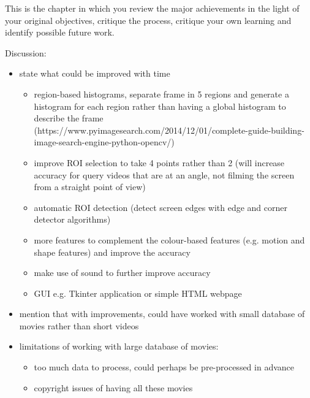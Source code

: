 This is the chapter in which you review the major achievements in the
light of your original objectives, critique the process, critique your
own learning and identify possible future work.

Discussion:
\begin{itemize}
    \item state what could be improved with time
    \begin{itemize}
        \item region-based histograms, separate frame in 5 regions and generate a histogram for each region rather than having a global histogram to describe the frame (https://www.pyimagesearch.com/2014/12/01/complete-guide-building-image-search-engine-python-opencv/)
        \item improve ROI selection to take 4 points rather than 2 (will increase accuracy for query videos that are at an angle, not filming the screen from a straight point of view)
        \item automatic ROI detection (detect screen edges with edge and corner detector algorithms)
        \item more features to complement the colour-based features (e.g. motion and shape features) and improve the accuracy
        \item make use of sound to further improve accuracy
        \item GUI e.g. Tkinter application or simple HTML webpage
    \end{itemize} 
    \item mention that with improvements, could have worked with small database of movies rather than short videos
    \item limitations of working with large database of movies: 
    \begin{itemize}
        \item too much data to process, could perhaps be pre-processed in advance
        \item copyright issues of having all these movies
    \end{itemize}
\end{itemize}
